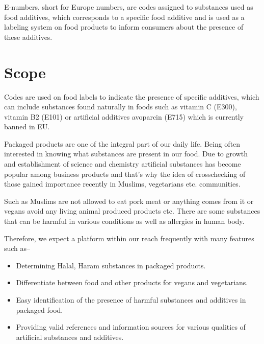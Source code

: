 \documentclass[a4paper,12pt]{report}
\begin{document}
E-numbers, short for Europe numbers, are codes assigned to substances used as food additives, which corresponds to a specific food additive and is used as a labeling system on food products to inform consumers about the presence of these additives.

\section*{Scope}
Codes are used on food labels to indicate the presence of specific additives, which can include substances found naturally in foods such as vitamin C (E300), vitamin B2 (E101) or artificial additives avoparcin (E715) which is currently banned in EU.

Packaged products are one of the integral part of our daily life. Being often interested in knowing what substances are present in our food. Due to growth and establishment of science and chemistry artificial substances has become popular among business products and that's why the idea of crosschecking of those gained importance recently in Muslims, vegetarians etc. communities.

Such as Muslims are not allowed to eat pork meat or anything comes from it \cite{muslim_pork_avoid} or vegans avoid any living animal produced products etc. There are some substances that can be harmful in various conditions as well as allergies in human body.

Therefore, we expect a platform within our reach frequently with many features such as--
\begin{itemize}
	\item Determining Halal, Haram substances in packaged products.
	\item Differentiate between food and other products for vegans and vegetarians.
	\item Easy identification of the presence of harmful substances and additives in packaged food.
	\item Providing valid references and information sources for various qualities of artificial substances and additives.
\end{itemize}
\end{document}
